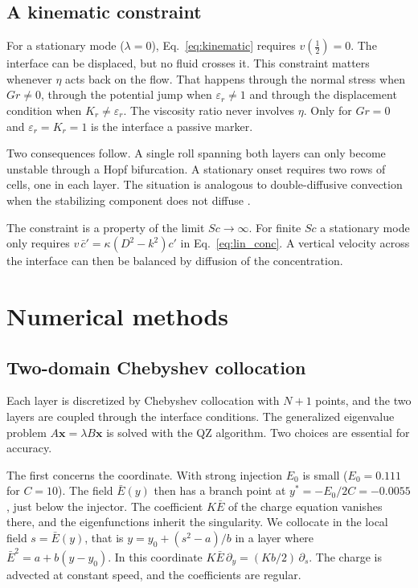 \documentclass[aip,pof,reprint,amsmath,amssymb]{revtex4-2}
\begin{document}
\subsection{A kinematic constraint}\label{sec:kinematic}

For a stationary mode ($\lambda=0$), Eq.~\eqref{eq:kinematic} requires $v(\tfrac12)=0$.
The interface can be displaced, but no fluid crosses it. This constraint matters whenever
$\eta$ acts back on the flow. That happens through the normal stress when $Gr\ne0$, through
the potential jump when $\varepsilon_r\ne1$ and through the displacement condition when
$K_r\ne\varepsilon_r$. The viscosity ratio never involves $\eta$. Only for $Gr=0$ and
$\varepsilon_r=K_r=1$ is the interface a passive marker.

Two consequences follow. A single roll spanning both layers can only become unstable
through a Hopf bifurcation. A stationary onset requires two rows of cells, one in each
layer. The situation is analogous to double-diffusive convection when the stabilizing
component does not diffuse \cite{Turner1973}.

The constraint is a property of the limit $Sc\to\infty$. For finite $Sc$ a stationary mode
only requires $v\,\bar c'=\kappa(D^2-k^2)c'$ in Eq.~\eqref{eq:lin_conc}. A vertical velocity
across the interface can then be balanced by diffusion of the concentration.

\section{Numerical methods}\label{sec:numerics}

\subsection{Two-domain Chebyshev collocation}

Each layer is discretized by Chebyshev collocation \cite{Trefethen2000} with $N+1$ points,
and the two layers are coupled through the interface conditions. The generalized
eigenvalue problem $A\bm x=\lambda B\bm x$ is solved with the QZ algorithm. Two choices are
essential for accuracy.

The first concerns the coordinate. With strong injection $E_0$ is small ($E_0=0.111$ for
$C=10$). The field $\bar E(y)$ then has a branch point at $y^*=-E_0/2C=-0.0055$, just
below the injector. The coefficient $K\bar E$ of the charge equation vanishes there, and
the eigenfunctions inherit the singularity. We collocate in the local field $s=\bar E(y)$,
that is $y=y_0+(s^2-a)/b$ in a layer where $\bar E^2=a+b(y-y_0)$. In this coordinate
$K\bar E\,\partial_y=(Kb/2)\,\partial_s$. The charge is advected at constant speed, and
the coefficients are regular.
\end{document}
